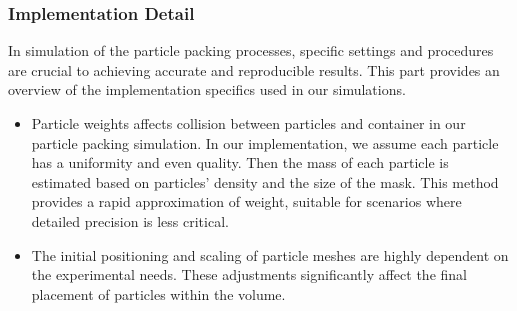 \documentclass[preprint,12pt]{elsarticle}
\begin{document}
\subsubsection{Implementation Detail} \label{subsubsec:syn:simu:imp_detail}
In simulation of the particle packing processes, specific settings and procedures are crucial to achieving accurate and reproducible results. 
This part provides an overview of the implementation specifics used in our simulations.
\begin{itemize}
    \item
    Particle weights affects collision between particles and container in our particle packing simulation. 
    In our implementation, we assume each particle has a uniformity and even quality. 
    Then the mass of each particle is estimated based on particles' density and the size of the mask.
    This method provides a rapid approximation of weight, suitable for scenarios where detailed precision is less critical. 
    \item
    The initial positioning and scaling of particle meshes are highly dependent on the experimental needs. 
    These adjustments significantly affect the final placement of particles within the volume. 
\end{itemize}
\end{document}
